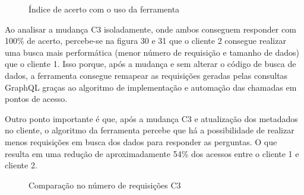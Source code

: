 \begin{figure}[H]
  \centering
  \caption{Índice de acerto com o uso da ferramenta}
\end{figure}

Ao analisar a mudança C3 isoladamente, onde ambos conseguem responder com 100\% de acerto, percebe-se na figura 30 e 31 que o cliente 2 consegue realizar uma busca mais performática (menor número de requisição e tamanho de dados) que o cliente 1. Isso porque, após a mudança e sem alterar o código de busca de dados, a ferramenta consegue remapear as requisições geradas pelas consultas GraphQL graças ao algoritmo de implementação e automação das chamadas em pontos de acesso.

Outro ponto importante é que, após a mudança C3 e atualização dos metadados no cliente, o algoritmo da ferramenta percebe que há a possibilidade de realizar menos requisições em busca dos dados para responder as perguntas. O que resulta em uma redução de aproximadamente 54\% dos acessos entre o cliente 1 e cliente 2.

\begin{figure}[H]
  \centering
  \caption{Comparação no número de requisições C3}
\end{figure}

